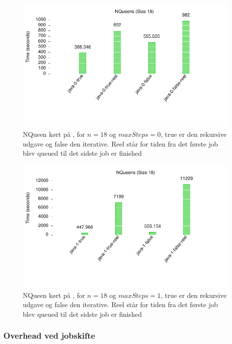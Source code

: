 \begin{figure}[h]
\begin{center}
\includegraphics{../benchmarks/mig.pdf}
\caption{NQueen kørt på \mig, for $n=18$ og $maxSteps=0$, true er den
rekursive udgave og false den iterative. Reel står for tiden fra det første job
blev queued til det sidste job er finished}
\label{figur:mig}
\end{center}
\end{figure}

\begin{figure}[h]
\begin{center}
\includegraphics{../benchmarks/mig1.pdf}
\caption{NQueen kørt på \mig, for $n=18$ og $maxSteps=1$, true er den
rekursive udgave og false den iterative. Reel står for tiden fra det første job
blev queued til det sidste job er finished}
\label{figur:mig1}
\end{center}
\end{figure}



\subsubsection{Overhead ved jobskifte}

